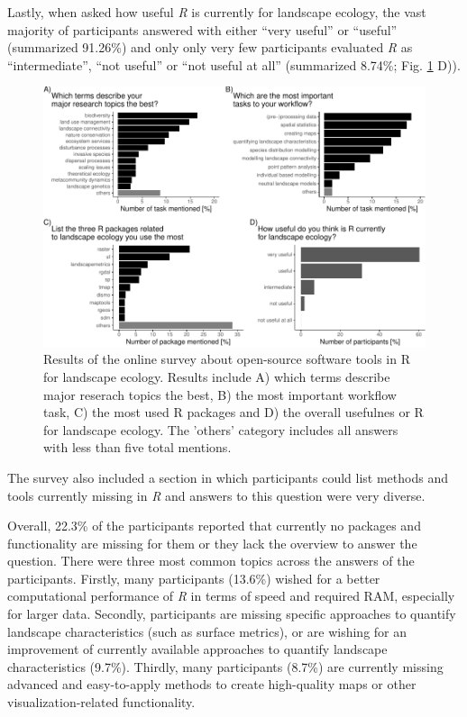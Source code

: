 \documentclass[smallextended]{svjour3}       %
\begin{document}
Lastly, when asked how useful \emph{R} is currently for landscape ecology, the vast majority of participants answered with either ``very useful'' or ``useful'' (summarized 91.26\%) and only only very few participants evaluated \emph{R} as ``intermediate'', ``not useful'' or ``not useful at all'' (summarized 8.74\%; Fig. \ref{fig:fig-survey} D)).

\begin{figure}

{\centering \includegraphics[width=1\linewidth]{paper_files/figure-latex/fig-survey-1} 

}

\caption{Results of the online survey about open-source software tools in R for landscape ecology. Results include A) which terms describe major reserach topics the best, B) the most important workflow task, C) the most used R packages and D) the overall usefulnes or R for landscape ecology. The 'others' category includes all answers with less than five total mentions.}\label{fig:fig-survey}
\end{figure}

The survey also included a section in which participants could list methods and tools currently missing in \emph{R} and answers to this question were very diverse.

Overall, 22.3\% of the participants reported that currently no packages and functionality are missing for them or they lack the overview to answer the question.
There were three most common topics across the answers of the participants.
Firstly, many participants (13.6\%) wished for a better computational performance of \emph{R} in terms of speed and required RAM, especially for larger data.
Secondly, participants are missing specific approaches to quantify landscape characteristics (such as surface metrics), or are wishing for an improvement of currently available approaches to quantify landscape characteristics (9.7\%).
Thirdly, many participants (8.7\%) are currently missing advanced and easy-to-apply methods to create high-quality maps or other visualization-related functionality.
\end{document}
